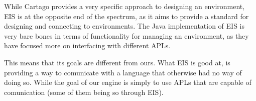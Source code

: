 While Cartago provides a very specific approach to designing an environment,
EIS is at the opposite end of the spectrum, as it aims to provide
a standard for designing and connecting to environments. The Java
implementation of EIS is very bare bones in terms of functionality
for managing an environment, as they have focused more on interfacing
with different APLs. 

This means that its goals are different from ours. What EIS is good
at, is providing a way to comunicate with a language that otherwise
had no way of doing so. While the goal of our engine is simply to
use APLs that are capable of comunication (some of them being so through
EIS).
